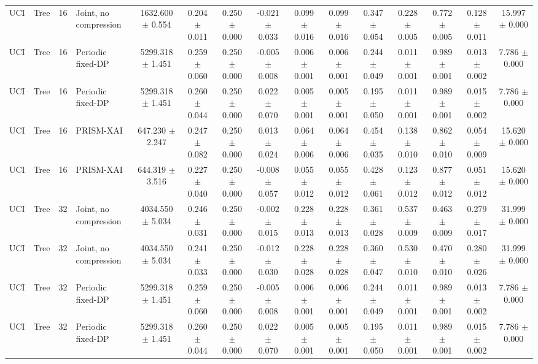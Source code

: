 \begin{table}[t]
\begin{tabular}{llllccccccccccc}
UCI & Tree & 16 & Joint, no compression & 1632.600 $\pm$ 0.554 & 0.204 $\pm$ 0.011 & 0.250 $\pm$ 0.000 & -0.021 $\pm$ 0.033 & 0.099 $\pm$ 0.016 & 0.099 $\pm$ 0.016 & 0.347 $\pm$ 0.054 & 0.228 $\pm$ 0.005 & 0.772 $\pm$ 0.005 & 0.128 $\pm$ 0.011 & 15.997 $\pm$ 0.000 \\
UCI & Tree & 16 & Periodic fixed-DP & 5299.318 $\pm$ 1.451 & 0.259 $\pm$ 0.060 & 0.250 $\pm$ 0.000 & -0.005 $\pm$ 0.008 & 0.006 $\pm$ 0.001 & 0.006 $\pm$ 0.001 & 0.244 $\pm$ 0.049 & 0.011 $\pm$ 0.001 & 0.989 $\pm$ 0.001 & 0.013 $\pm$ 0.002 & 7.786 $\pm$ 0.000 \\
UCI & Tree & 16 & Periodic fixed-DP & 5299.318 $\pm$ 1.451 & 0.260 $\pm$ 0.044 & 0.250 $\pm$ 0.000 & 0.022 $\pm$ 0.070 & 0.005 $\pm$ 0.001 & 0.005 $\pm$ 0.001 & 0.195 $\pm$ 0.050 & 0.011 $\pm$ 0.001 & 0.989 $\pm$ 0.001 & 0.015 $\pm$ 0.002 & 7.786 $\pm$ 0.000 \\
UCI & Tree & 16 & PRISM-XAI & 647.230 $\pm$ 2.247 & 0.247 $\pm$ 0.082 & 0.250 $\pm$ 0.000 & 0.013 $\pm$ 0.024 & 0.064 $\pm$ 0.006 & 0.064 $\pm$ 0.006 & 0.454 $\pm$ 0.035 & 0.138 $\pm$ 0.010 & 0.862 $\pm$ 0.010 & 0.054 $\pm$ 0.009 & 15.620 $\pm$ 0.000 \\
UCI & Tree & 16 & PRISM-XAI & 644.319 $\pm$ 3.516 & 0.227 $\pm$ 0.040 & 0.250 $\pm$ 0.000 & -0.008 $\pm$ 0.057 & 0.055 $\pm$ 0.012 & 0.055 $\pm$ 0.012 & 0.428 $\pm$ 0.061 & 0.123 $\pm$ 0.012 & 0.877 $\pm$ 0.012 & 0.051 $\pm$ 0.012 & 15.620 $\pm$ 0.000 \\
UCI & Tree & 32 & Joint, no compression & 4034.550 $\pm$ 5.034 & 0.246 $\pm$ 0.031 & 0.250 $\pm$ 0.000 & -0.002 $\pm$ 0.015 & 0.228 $\pm$ 0.013 & 0.228 $\pm$ 0.013 & 0.361 $\pm$ 0.028 & 0.537 $\pm$ 0.009 & 0.463 $\pm$ 0.009 & 0.279 $\pm$ 0.017 & 31.999 $\pm$ 0.000 \\
UCI & Tree & 32 & Joint, no compression & 4034.550 $\pm$ 5.034 & 0.241 $\pm$ 0.033 & 0.250 $\pm$ 0.000 & -0.012 $\pm$ 0.030 & 0.228 $\pm$ 0.028 & 0.228 $\pm$ 0.028 & 0.360 $\pm$ 0.047 & 0.530 $\pm$ 0.010 & 0.470 $\pm$ 0.010 & 0.280 $\pm$ 0.026 & 31.999 $\pm$ 0.000 \\
UCI & Tree & 32 & Periodic fixed-DP & 5299.318 $\pm$ 1.451 & 0.259 $\pm$ 0.060 & 0.250 $\pm$ 0.000 & -0.005 $\pm$ 0.008 & 0.006 $\pm$ 0.001 & 0.006 $\pm$ 0.001 & 0.244 $\pm$ 0.049 & 0.011 $\pm$ 0.001 & 0.989 $\pm$ 0.001 & 0.013 $\pm$ 0.002 & 7.786 $\pm$ 0.000 \\
UCI & Tree & 32 & Periodic fixed-DP & 5299.318 $\pm$ 1.451 & 0.260 $\pm$ 0.044 & 0.250 $\pm$ 0.000 & 0.022 $\pm$ 0.070 & 0.005 $\pm$ 0.001 & 0.005 $\pm$ 0.001 & 0.195 $\pm$ 0.050 & 0.011 $\pm$ 0.001 & 0.989 $\pm$ 0.001 & 0.015 $\pm$ 0.002 & 7.786 $\pm$ 0.000 \\

\end{tabular}
\end{table}
